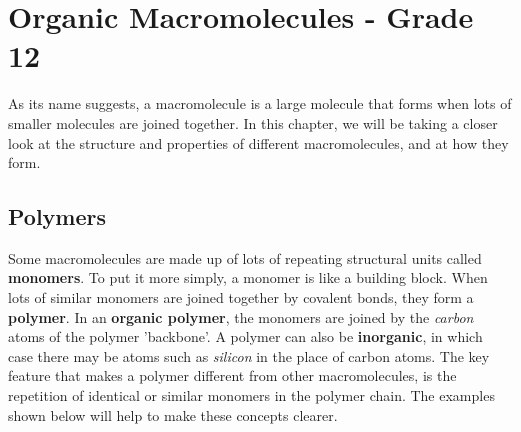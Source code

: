 






\chapter{Organic Macromolecules - Grade 12}
\label{chap:orgmac}

As its name suggests, a macromolecule is a large molecule that forms when lots of smaller molecules are joined together. In this chapter, we will be taking a closer look at the structure and properties of different macromolecules, and at how they form. 



\section{Polymers}
\label{sec:orgmac:polymers}

Some macromolecules are made up of lots of repeating structural units called \textbf{monomers}. To put it more simply, a monomer is like a building block. When lots of similar monomers are joined together by covalent bonds, they form a \textbf{polymer}. In an \textbf{organic polymer}, the monomers are joined by the \textit{carbon} atoms of the polymer 'backbone'. A polymer can also be \textbf{inorganic}, in which case there may be atoms such as \textit{silicon} in the place of carbon atoms. The key feature that makes a polymer different from other macromolecules, is the repetition of identical or similar monomers in the polymer chain. The examples shown below will help to make these concepts clearer. 




